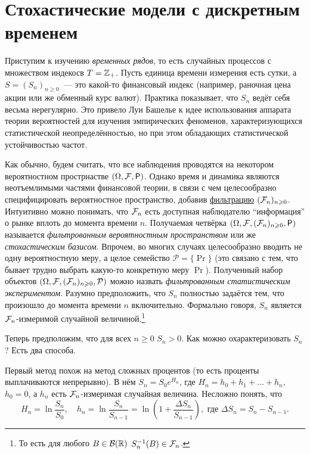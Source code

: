 \section{Стохастические модели с дискретным временем}
Приступим к изучению \emph{временных рядов}, то есть случайных процессов с 
множеством индекосв \(T = \mathbb{Z}_{+}\). Пусть единица времени измерения есть сутки, 
а \(S = (S_{n})_{n \geq 0}\)~--- это какой-то финансовый индекс (например, 
раночная цена акции или же обменный курс валют). Практика показывает, что 
\(S_{n}\) ведёт себя весьма нерегулярно. Это привело Луи Башелье к идее 
использования аппарата теории вероятностей для изучения эмпирических феноменов, 
характеризующихся статистической неопределённостью, но при этом обладающих 
статистической устойчивостью частот.

Как обычно, будем считать, что все наблюдения проводятся на некотором 
вероятностном прострнастве \((\Omega, \F, \Pr)\). Однако время и динамика 
являются неотъемлимыми частями финансовой теории, в связи с чем целесообразно 
специфицировать вероятностное пространство, добавив 
\hyperref[def-filtration]{фильтрацию} \((\mathcal{F}_{n})_{n \geqslant 0}\). Интуитивно можно 
понимать, что \(\mathcal{F}_{n}\) есть доступная наблюдателю ``информация'' о рынке 
вплоть до момента времени \(n\). Получаемая четвёрка \((\Omega, \F, (\F_{n})_{n 
\geq 0}, \Pr)\) называется \emph{фильтрованным вероятностным пространством} или 
же \emph{стохастическим базисом}. Впрочем, во многих случаях целесообразно 
вводить не одну вероятностную меру, а целое семейство \(\mathcal{P} = \{\Pr\}\) 
(это связано с тем, что бывает трудно выбрать какую-то конкретную меру 
\(\Pr\)). Полученный набор объектов \((\Omega, \mathcal{F}, (\mathcal{F}_{n})_{n \geqslant 0}, 
\mathcal{P})\) можно назвать \emph{фильтрованным статистическим экспериментом}.
\label{price-time-series}
Разумно предположить, что \(S_{n}\) полностью задаётся тем, что произошло до 
момента времени \(n\) включительно. Формально говоря, \(S_{n}\) является 
\(\mathcal{F}_{n}\)-измеримой случайной величиной.\footnote{То есть для любого \(B \in 
\mathcal{B}(\mathbb{R})\) \(S_{n}^{-1}(B) \in \mathcal{F}_{n}\).}

Теперь предположим, что для всех \(n \geq 0\) \(S_{n} > 0\). Как можно 
охарактеризовать \(S_{n}\)? Есть два способа.

Первый метод похож на метод сложных процентов (то есть проценты выплачиваются 
непрерывно). В нём \(S_{n} = S_{0}e^{H_{n}}\), где \(H_{n} = h_{0} + h_{1} + 
\ldots + h_{n}\), \(h_{0} = 0\), а \(h_{n}\) есть \(\mathcal{F}_{n}\)-измеримая 
случайная величина. Несложно 
понять, что
\[
	H_{n} = \ln\frac{S_{n}}{S_{0}}, \quad h_{n} = \ln\frac{S_{n}}{S_{n - 1}} = 
	\ln\left(1 + \frac{\Delta S_{n}}{S_{n - 1}}\right), \text{ где } \Delta 
	S_{n} = S_{n} - S_{n - 1}.
\]

